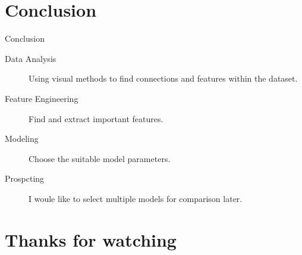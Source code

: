 \documentclass[
 size=12pt,
 paper=smartboard, %
 mode=present, %
 display=slides, %
style=tuliplab,
pauseslide,
fleqn,leqno]{powerdot}
\begin{document}
\section{Conclusion}
\begin{slide}[toc=,bm=]{Conclusion}
\begin{description}
  \item[Data Analysis] Using visual methods to find connections and features within the dataset.
  \item[Feature Engineering] Find and extract important features. 
  \item[Modeling] Choose the suitable model parameters.
  \item[Prospcting] I woule like to select multiple models for comparison later.
\end{description}
\end{slide}

\section{Thanks for watching}


\end{document}
